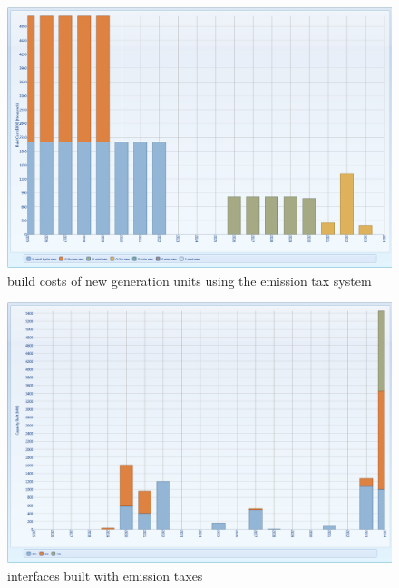 \documentclass{article}
\begin{document}
\begin{figure}[htbp]
\begin{center}
\includegraphics[width=13cm,keepaspectratio=true]{figures/Expansion/EmissionTax/BuildCostET}
\caption{build costs of new generation units using the emission tax system}
\label{fig:BuildCostET}
\end{center}
\end{figure}
\begin{figure}[htbp]
\begin{center}
\includegraphics[width=13cm,keepaspectratio=true]{figures/Expansion/EmissionTax/CapacityBuiltInterfaceET}
\caption{interfaces built with emission taxes}
\label{fig:CapacityBuiltInterfaceET}
\end{center}
\end{figure}
\end{document}

